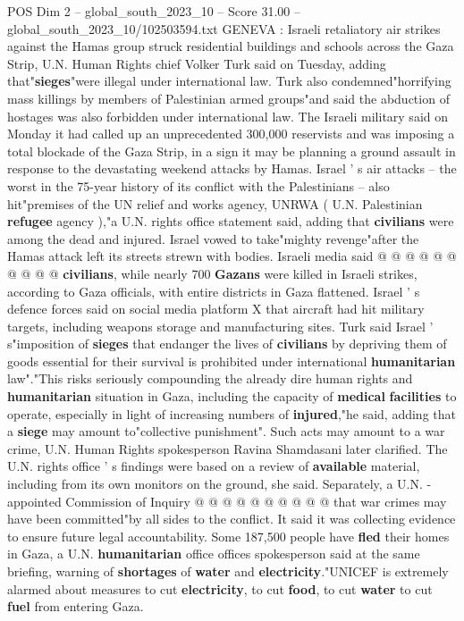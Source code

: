 \begin{textsample}{POS Dim 2 – global\_south\_2023\_10 – Score 31.00 – global\_south\_2023\_10/102503594.txt}  \label{ex:f2_pos_172}
GENEVA : Israeli retaliatory air strikes against the Hamas group struck residential buildings and schools across the Gaza Strip, U.N.
Human Rights chief Volker Turk said on Tuesday, adding that"\textbf{sieges}"were illegal under international law.
Turk also condemned"horrifying mass killings by members of Palestinian armed groups"and said the abduction of hostages was also forbidden under international law.
The Israeli military said on Monday it had called up an unprecedented 300,000 reservists and was imposing a total blockade of the Gaza Strip, in a sign it may be planning a ground assault in response to the devastating weekend attacks by Hamas.
Israel ' s air attacks -- the worst in the 75-year history of its conflict with the Palestinians -- also hit"premises of the UN relief and works agency, UNRWA ( U.N.
Palestinian \textbf{refugee} agency ),"a U.N. rights office statement said, adding that \textbf{civilians} were among the dead and injured.
Israel vowed to take"mighty revenge"after the Hamas attack left its streets strewn with bodies.
Israeli media said @ @ @ @ @ @ @ @ @ @ \textbf{civilians}, while nearly 700 \textbf{Gazans} were killed in Israeli strikes, according to Gaza officials, with entire districts in Gaza flattened.
Israel ' s defence forces said on social media platform X that aircraft had hit military targets, including weapons storage and manufacturing sites.
Turk said Israel ' s"imposition of \textbf{sieges} that endanger the lives of \textbf{civilians} by depriving them of goods essential for their survival is prohibited under international \textbf{humanitarian} law"."This risks seriously compounding the already dire human rights and \textbf{humanitarian} situation in Gaza, including the capacity of \textbf{medical} \textbf{facilities} to operate, especially in light of increasing numbers of \textbf{injured},"he said, adding that a \textbf{siege} may amount to"collective punishment".
Such acts may amount to a war crime, U.N.
Human Rights spokesperson Ravina Shamdasani later clarified.
The U.N. rights office ' s findings were based on a review of \textbf{available} material, including from its own monitors on the ground, she said.
Separately, a U.N. -appointed Commission of Inquiry @ @ @ @ @ @ @ @ @ @ that war crimes may have been committed"by all sides to the conflict.
It said it was collecting evidence to ensure future legal accountability.
Some 187,500 people have \textbf{fled} their homes in Gaza, a U.N. \textbf{humanitarian} office offices spokesperson said at the same briefing, warning of \textbf{shortages} of \textbf{water} and \textbf{electricity}."UNICEF is extremely alarmed about measures to cut \textbf{electricity}, to cut \textbf{food}, to cut \textbf{water} to cut \textbf{fuel} from entering Gaza.

\end{textsample}
